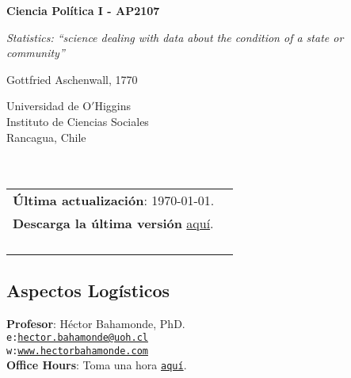 \documentclass[letterpaper]{article}
\def\name{Ciencia Pol\'itica I - AP2107}
\begin{document}

\centerline{\huge \bf \name}

\epigraph{\emph{Statistics: ``science dealing with data about the condition of a state or community''}}{Gottfried Aschenwall, 1770}


\vspace{0.25in}

\begin{minipage}{0.45\linewidth}
 Universidad de O$'$Higgins \\
  Instituto de Ciencias Sociales \\
  Rancagua, Chile\\
  \\
  \\

\end{minipage}
\hspace{4cm}\begin{minipage}{0.45\linewidth}
  \begin{tabular}{ll}
{\bf \'Ultima actualizaci\'on}: \today. \\
 {\bf Descarga la \'ultima versi\'on} \href{https://github.com/hbahamonde/Ciencia_Politica_I/raw/master/Bahamonde_Ciencia_Politica_I.pdf}{aqu\'i}.%
    \\
    \\
    \\
    \\
    \\
  \end{tabular}
\end{minipage}



\subsection*{Aspectos Log\'isticos}


\vspace{1mm}
{\bf Profesor}: H\'ector Bahamonde, PhD.\\
\texttt{e:}\href{mailto:hector.bahamonde@uoh.cl}{\texttt{hector.bahamonde@uoh.cl}}\\
\texttt{w:}\href{http://www.hectorbahamonde.com}{\texttt{www.hectorbahamonde.com}}\\
{\bf Office Hours}: Toma una hora \href{https://calendly.com/bahamonde/officehours}{\texttt{aqu\'i}}.
\end{document}
